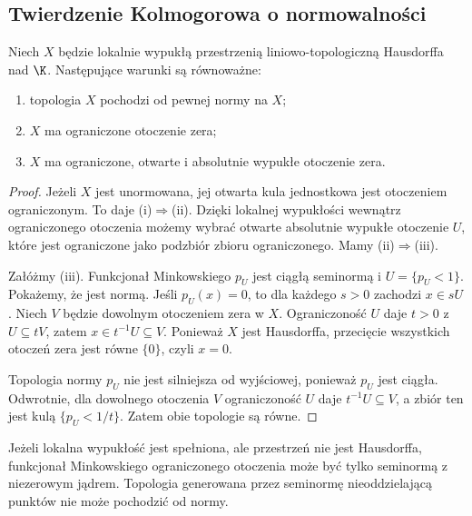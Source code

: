 \subsection{Twierdzenie Kolmogorowa o normowalności}

\begin{twierdzenie}
\label{thm:kolmogorov-normability}
Niech $X$ będzie lokalnie wypukłą przestrzenią
liniowo-topologiczną Hausdorffa nad $\K$.
Następujące warunki są równoważne:
\begin{enumerate}[label=\textup{(\roman*)}]
\item topologia $X$ pochodzi od pewnej normy na $X$;
\item $X$ ma ograniczone otoczenie zera;
\item $X$ ma ograniczone, otwarte i absolutnie wypukłe otoczenie zera.
\end{enumerate}
\end{twierdzenie}
\begin{proof}
Jeżeli $X$ jest unormowana, jej otwarta kula jednostkowa
jest otoczeniem ograniczonym. To daje (i)$\Rightarrow$(ii).
Dzięki lokalnej wypukłości wewnątrz ograniczonego
otoczenia możemy wybrać otwarte absolutnie wypukłe
otoczenie $U$, które jest ograniczone jako podzbiór
zbioru ograniczonego. Mamy (ii)$\Rightarrow$(iii).

Załóżmy (iii). Funkcjonał Minkowskiego $p_U$ jest
ciągłą seminormą i $U=\{p_U<1\}$.
Pokażemy, że jest normą. Jeśli $p_U(x)=0$,
to dla każdego $s>0$ zachodzi $x\in sU$.
Niech $V$ będzie dowolnym otoczeniem zera w $X$.
Ograniczoność $U$ daje $t>0$ z $U\subseteq tV$,
zatem $x\in t^{-1}U\subseteq V$.
Ponieważ $X$ jest Hausdorffa, przecięcie wszystkich
otoczeń zera jest równe $\{0\}$, czyli $x=0$.

Topologia normy $p_U$ nie jest silniejsza od wyjściowej,
ponieważ $p_U$ jest ciągła. Odwrotnie, dla dowolnego
otoczenia $V$ ograniczoność $U$ daje
$t^{-1}U\subseteq V$, a zbiór ten jest kulą
$\{p_U<1/t\}$. Zatem obie topologie są równe.
\end{proof}

\begin{uwaga}
Jeżeli lokalna wypukłość jest spełniona, ale przestrzeń
nie jest Hausdorffa, funkcjonał Minkowskiego ograniczonego
otoczenia może być tylko seminormą z niezerowym jądrem.
Topologia generowana przez seminormę nieoddzielającą punktów
nie może pochodzić od normy.
\end{uwaga}

